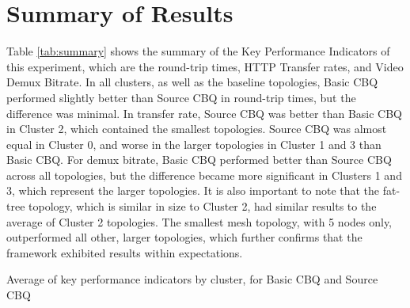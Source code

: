 \section{Summary of Results}

Table \ref{tab:summary} shows the summary of the Key Performance Indicators of this experiment, which are the round-trip times, HTTP Transfer rates, and Video Demux Bitrate. In all clusters, as well as the baseline topologies, Basic CBQ performed slightly better than Source CBQ in round-trip times, but the difference was minimal. In transfer rate, Source CBQ was better than Basic CBQ in Cluster 2, which contained the smallest topologies. Source CBQ was almost equal in Cluster 0, and worse in the larger topologies in Cluster 1 and 3 than Basic CBQ. For demux bitrate, Basic CBQ performed better than Source CBQ across all topologies, but the difference became more significant in Clusters 1 and 3, which represent the larger topologies. It is also important to note that the fat-tree topology, which is similar in size to Cluster 2, had similar results to the average of Cluster 2 topologies. The smallest mesh topology, with 5 nodes only, outperformed all other, larger topologies, which further confirms that the framework exhibited results within expectations.

\begin{table}[htbp]
    \caption{Average of key performance indicators by cluster, for Basic CBQ and Source CBQ}
    \centering
    
    \label{tab:summary}
\end{table}

